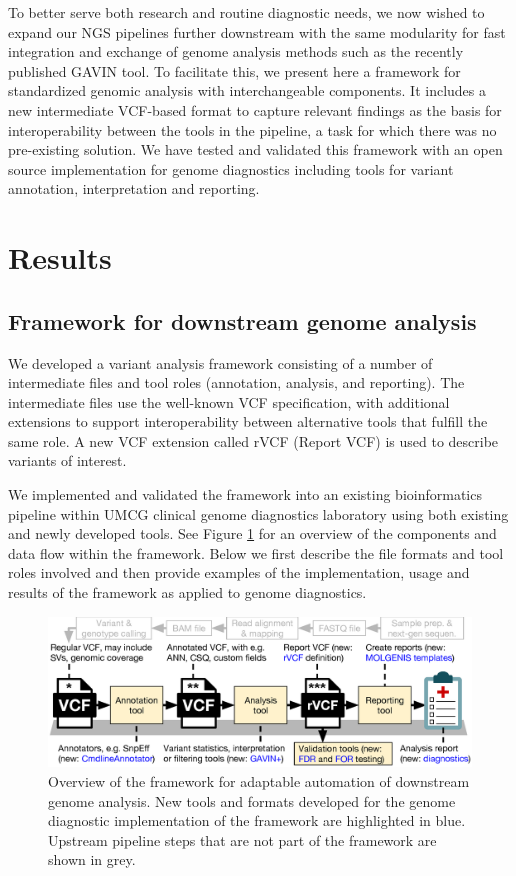 To better serve both research and routine diagnostic needs, we now wished to expand our NGS pipelines further downstream with the same modularity for fast integration and exchange of genome analysis methods such as the recently published GAVIN tool\cite{van_der_Velde_2017}.
To facilitate this, we present here a framework for standardized genomic analysis with interchangeable components.
It includes a new intermediate VCF-based format to capture relevant findings as the basis for interoperability between the tools in the pipeline, a task for which there was no pre-existing solution. We have tested and validated this framework with an open source implementation for genome diagnostics including tools for variant annotation, interpretation and reporting.


\section{Results}

\subsection{Framework for downstream genome analysis}

We developed a variant analysis framework consisting of a number of intermediate files and tool roles (annotation, analysis, and reporting).
The intermediate files use the well-known VCF specification, with additional extensions to support interoperability between alternative tools that fulfill the same role.
A new VCF extension called rVCF (Report VCF) is used to describe variants of interest.

We implemented and validated the framework into an existing bioinformatics pipeline within UMCG clinical genome diagnostics laboratory using both existing and newly developed tools.
See Figure \ref{fig:frameworkforgenomics_overview} for an overview of the components and data flow within the framework.
Below we first describe the file formats and tool roles involved and then provide examples of the implementation, usage and results of the framework as applied to genome diagnostics.\\

\begin{figure}
\centering
\includegraphics[width=1.0\linewidth]{img/frameworkforgenomics_overview}
\caption[Overview of the framework for automation]{Overview of the framework for adaptable automation of downstream genome analysis. New tools and formats developed for the genome diagnostic implementation of the framework are highlighted in blue. Upstream pipeline steps that are not part of the framework are shown in grey.}
\label{fig:frameworkforgenomics_overview}
\end{figure}

